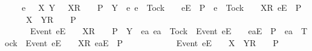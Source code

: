 \begin{isabellebody}
\ \ \ \ {\isacharparenleft}{\isasymAnd}e\ {\isasymrho}\ {\isasymsigma}\ X\ Y{\isachardot}\ {\isacharparenleft}{\isacharparenleft}{\isasymrho}\ {\isacharat}\ {\isacharbrackleft}{\isacharbrackleft}X{\isacharbrackright}\isactrlsub R{\isacharbrackright}\ {\isacharat}\ {\isasymsigma}\ {\isasymin}\ P\ {\isasymand}\ {\isacharparenleft}Y\ {\isasyminter}\ {\isacharbraceleft}e{\isachardot}\ {\isacharparenleft}e\ {\isasymnoteq}\ Tock\ {\isasymand}\ {\isasymrho}\ {\isacharat}\ {\isacharbrackleft}{\isacharbrackleft}e{\isacharbrackright}\isactrlsub E{\isacharbrackright}\ {\isasymin}\ P{\isacharparenright}\ {\isasymor}\ {\isacharparenleft}e\ {\isacharequal}\ Tock\ {\isasymand}\ {\isasymrho}\ {\isacharat}\ {\isacharbrackleft}{\isacharbrackleft}X{\isacharbrackright}\isactrlsub R{\isacharcomma}\ {\isacharbrackleft}e{\isacharbrackright}\isactrlsub E{\isacharbrackright}\ {\isasymin}\ P{\isacharparenright}{\isacharbraceright}\ {\isacharequal}\ {\isacharbraceleft}{\isacharbraceright}{\isacharparenright}{\isacharparenright}\ {\isasymLongrightarrow}\ {\isasymrho}\ {\isacharat}\ {\isacharbrackleft}{\isacharbrackleft}X\ {\isasymunion}\ Y{\isacharbrackright}\isactrlsub R{\isacharbrackright}\ {\isacharat}\ {\isasymsigma}\ {\isasymin}\ P{\isacharparenright}\ {\isasymLongrightarrow}\ \isanewline
\ \ \ \ \ \ {\isacharparenleft}{\isacharparenleft}{\isacharbrackleft}Event\ e{\isacharbrackright}\isactrlsub E\ {\isacharhash}\ {\isasymrho}\ {\isacharat}\ {\isacharbrackleft}{\isacharbrackleft}X{\isacharbrackright}\isactrlsub R{\isacharbrackright}\ {\isacharat}\ {\isasymsigma}\ {\isasymin}\ P\ {\isasymand}\ {\isacharparenleft}Y\ {\isasyminter}\ {\isacharbraceleft}ea{\isachardot}\ {\isacharparenleft}ea\ {\isasymnoteq}\ Tock\ {\isasymand}\ {\isacharbrackleft}Event\ e{\isacharbrackright}\isactrlsub E\ {\isacharhash}\ {\isasymrho}\ {\isacharat}\ {\isacharbrackleft}{\isacharbrackleft}ea{\isacharbrackright}\isactrlsub E{\isacharbrackright}\ {\isasymin}\ P{\isacharparenright}\ {\isasymor}\ {\isacharparenleft}ea\ {\isacharequal}\ Tock\ {\isasymand}\ {\isacharbrackleft}Event\ e{\isacharbrackright}\isactrlsub E\ {\isacharhash}\ {\isasymrho}\ {\isacharat}\ {\isacharbrackleft}{\isacharbrackleft}X{\isacharbrackright}\isactrlsub R{\isacharcomma}\ {\isacharbrackleft}ea{\isacharbrackright}\isactrlsub E{\isacharbrackright}\ {\isasymin}\ P{\isacharparenright}{\isacharbraceright}\ {\isacharequal}\ {\isacharbraceleft}{\isacharbraceright}{\isacharparenright}{\isacharparenright}\ {\isasymLongrightarrow}\ \isanewline
\ \ \ \ \ \ \ \ {\isacharbrackleft}Event\ e{\isacharbrackright}\isactrlsub E\ {\isacharhash}\ {\isasymrho}\ {\isacharat}\ {\isacharbrackleft}{\isacharbrackleft}X\ {\isasymunion}\ Y{\isacharbrackright}\isactrlsub R{\isacharbrackright}\ {\isacharat}\ {\isasymsigma}\ {\isasymin}\ P{\isacharparenright}{\isacharparenright}\ {\isasymLongrightarrow}\isanewline

\end{isabellebody}
